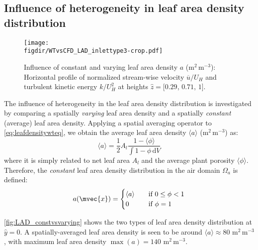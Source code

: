 \subsection{Influence of heterogeneity in leaf area density distribution}

\begin{figure}[p]
	\centering
	\texttt{[image: \\figdir/WTvsCFD\_LAD\_inlettype3-crop.pdf]}
	\caption{Influence of constant and varying leaf area density $a$ (m$^2$\,m$^{-3}$): Horizontal profile of normalized stream-wise velocity $\overline{u}/U_H$ and turbulent kinetic energy $k/U_H^2$ at heights $\hat{z} = [0.29$, $0.71$, $1]$.}
	\label{fig:WTvsCFD_LAD}
\end{figure}

The influence of heterogeneity in the leaf area density distribution is investigated by comparing a spatially \textit{varying} leaf area density and a spatially \textit{constant} (average) leaf area density. Applying a spatial averaging operator to \cref{eq:leafdensitywteq}, we obtain the average leaf area density $\langle a\rangle$  (m$^2$\,m$^{-3}$) as:
	\begin{equation}
	\langle a \rangle = \frac{1}{2} {A}_l \frac{1 - \langle \phi \rangle}{\int {1 - \phi }\,\mathrm{d}V}
	\label{eq:leafdensitywteqaverage}
	\end{equation} 
where it is simply related to net leaf area $A_l$ and the average plant porosity $\langle \phi \rangle$. Therefore, the \textit{constant} leaf area density distribution in the air domain $\Omega_a$ is defined:
\begin{equation}
a(\mvec{x}) =
	\begin{cases}
	\langle a \rangle       	  & \quad \text{if}\ 0\le \phi < 1\\
	0  							  & \quad \text{if}\ \phi = 1
	\end{cases}
	\label{eq:leafdensitywteqaveragefield}
\end{equation}

\cref{fig:LAD_constvsvarying} shows the two types of leaf area density distribution at $\hat{y} = 0$. A spatially-averaged leaf area density is seen to be around $\langle a \rangle \approx 80$ m$^{2}$\,m$^{-3}$, with maximum leaf area density $\max (a) = 140$ m$^{2}$\,m$^{-3}$. %

	
